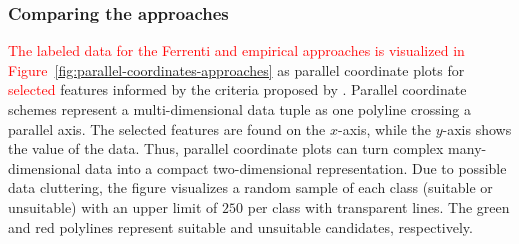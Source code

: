 \documentclass[superscriptaddress,unsortedaddress,
 amsmath,amssymb,
 aps,
]{revtex4-2}
\newcommand{\mrk}[1]{\textcolor{red}{#1}}
\begin{document}
\subsubsection*{Comparing the approaches}

\mrk{The labeled data for the Ferrenti and empirical approaches is visualized in Figure~\ref{fig:parallel-coordinates-approaches}} as parallel coordinate plots for \mrk{selected} features informed by the criteria proposed by \citeauthor{Weber2010} \cite{Weber2010}. Parallel coordinate schemes \cite{Inselberga1990, Inselberg1985} represent a multi-dimensional data tuple as one polyline crossing a parallel axis. The selected features are found on the $x$-axis, while the $y$-axis shows the value of the data. Thus, parallel coordinate plots can turn complex many-dimensional data into a compact  two-dimensional representation. Due to possible data cluttering, the figure visualizes a random sample of each class (suitable or unsuitable) with an upper limit of $250$ per class with transparent lines. The green and red polylines represent suitable and unsuitable candidates, respectively. 
\end{document}

